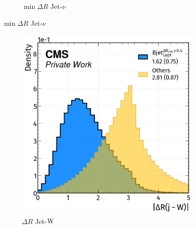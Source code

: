 \begin{figure}[H]
\begin{subfigure}{0.4775\linewidth}
        \caption{$\min \Delta R$ Jet-$\nu$}
    \end{subfigure}  
\end{figure}

\newpage
\begin{figure}[H]
    \ContinuedFloat
    \vspace{-0.5cm}
    \centering
    
    \hfill
        \begin{subfigure}{0.49\linewidth}
        \centering
        \includegraphics[width=1\linewidth]{fig//chap08-kin_reco/dr_W.png}
        \caption{$\Delta R$ Jet-${\text{W}}$}
    \end{subfigure}
    \hfill
    \begin{subfigure}{0.475\linewidth}  
        \centering

\end{subfigure}
\end{figure}
